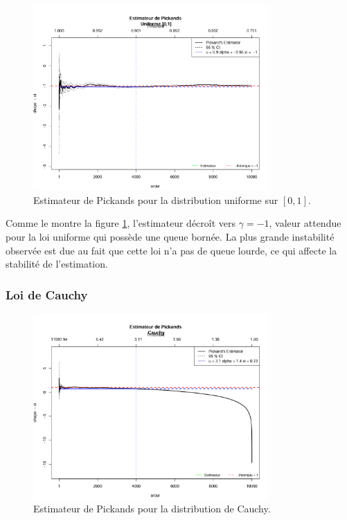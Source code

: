 \documentclass{article}
\theoremstyle{plain}
\theoremstyle{definition}
\theoremstyle{plain}
\begin{document}
\begin{figure}[H]
    \centering
    \includegraphics[width=0.8\textwidth]{./images/uniforme.png}
    \caption{Estimateur de Pickands pour la distribution uniforme sur \([0,1]\).}
    \label{fig:pickands_uniforme}
\end{figure}

Comme le montre la figure \ref{fig:pickands_uniforme}, l’estimateur décroît vers \(\gamma = -1\), valeur attendue pour la loi uniforme qui possède une queue bornée. La plus grande instabilité observée est due au fait que cette loi n’a pas de queue lourde, ce qui affecte la stabilité de l’estimation.

\subsubsection{Loi de Cauchy}

\begin{figure}[H]
    \centering
    \includegraphics[width=0.8\textwidth]{./images/cauchy.png}
    \caption{Estimateur de Pickands pour la distribution de Cauchy.}
    \label{fig:pickands_cauchy}
\end{figure}
\end{document}
